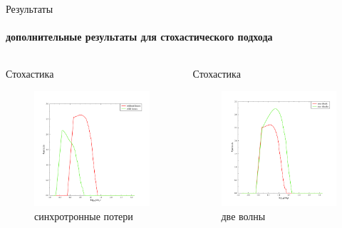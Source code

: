 \documentclass[8pt,pdf,hyperref={unicode},serif]{beamer}
\begin{document}
\begin{frame}{Результаты}
\framesubtitle{дополнительные результаты для стохастического подхода}
\begin{columns}
\begin{column}{0.5\textwidth}
Стохастика
\begin{figure}[H]
\centering
\includegraphics[width=0.90\linewidth]{stoh_sinh_or_not}
\caption{синхротронные потери}
\end{figure}
\end{column}

\begin{column}{0.5\textwidth}
Стохастика
\begin{figure}[H]
\centering
\includegraphics[width=0.90\linewidth]{stoh_two_or_one}
\caption{две волны}
\end{figure}
\end{column}
\end{columns}
\end{frame}
\end{document}
